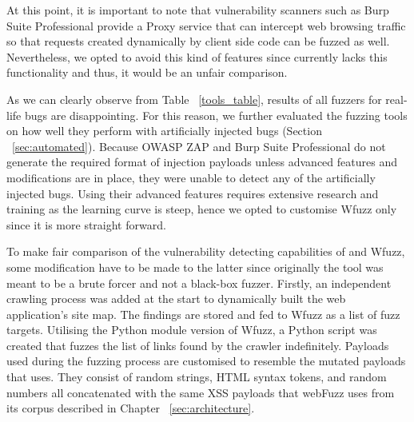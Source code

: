 At this point, it is important to note that vulnerability scanners such as Burp Suite Professional provide a Proxy service that can intercept web browsing traffic so that requests created dynamically by client side code can be fuzzed as well. Nevertheless, we opted to avoid this kind of features since \pname{} currently lacks this functionality and thus, it would be an unfair comparison.

As we can clearly observe from Table ~\ref{tools_table}, results of all fuzzers for real-life bugs are disappointing. For this reason, we further evaluated the fuzzing tools on how well they perform with artificially injected bugs (Section ~\ref{sec:automated}). Because OWASP ZAP and Burp Suite Professional do not generate the required format of injection payloads unless advanced features and modifications are in place, they were unable to detect any of the artificially injected bugs. Using their advanced features requires extensive research and training as the learning curve is steep, hence we opted to customise Wfuzz only since it is more straight forward.

To make fair comparison of the vulnerability detecting capabilities of \pname{} and Wfuzz, some modification have to be made to the latter since originally the tool was meant to be a brute forcer and not a black-box fuzzer. Firstly, an independent crawling process was added at the start to dynamically built the web application's site map. The findings are stored and fed to Wfuzz as a list of fuzz targets. Utilising the Python module version of Wfuzz, a Python script was created that fuzzes the list of links found by the crawler indefinitely. Payloads used during the fuzzing process are customised to resemble the mutated payloads that \pname{} uses. They consist of random strings, HTML syntax tokens, and random numbers all concatenated with the same XSS payloads that webFuzz uses from its corpus described in Chapter ~\ref{sec:architecture}.

